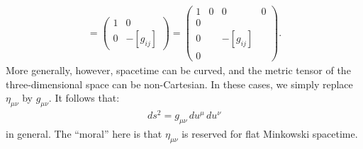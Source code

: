 \documentclass{book}
\theoremstyle{definition}
\begin{document}
\begin{align*}
[\eta_{\mu\nu}] = 
\begin{pmatrix}
1 & 0\\
0 & -[g_{ij}]
\end{pmatrix}
=
\begin{pmatrix}
1 & 0 & 0 & 0\\
0 & & &\\
0 & & -[g_{ij}] &\\
0 & & &
\end{pmatrix}.
\end{align*} 
More generally, however, spacetime can be curved, and the metric tensor of the three-dimensional space can be non-Cartesian. In these cases, we simply replace $\eta_{\mu\nu}$ by $g_{\mu\nu}$. It follows that:
\begin{align*}
\boxed{ds^2 = g_{\mu\nu}\,du^\mu\,du^\nu}
\end{align*}
in general. The ``moral'' here is that $\eta_{\mu\nu}$ is reserved for flat Minkowski spacetime. \\
\end{document}
